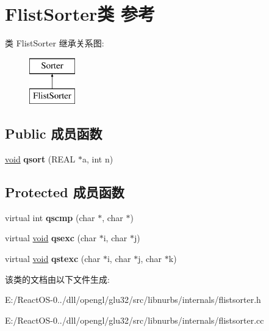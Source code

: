 \hypertarget{class_flist_sorter}{}\section{Flist\+Sorter类 参考}
\label{class_flist_sorter}
类 Flist\+Sorter 继承关系图\+:\begin{figure}[H]
\begin{center}
\leavevmode
\includegraphics[height=2.000000cm]{class_flist_sorter}
\end{center}
\end{figure}
\subsection*{Public 成员函数}
\begin{DoxyCompactItemize}
\item 
\mbox{\label{class_flist_sorter_ac0981ea723babeab25e674a819e35c62}} 
\hyperlink{interfacevoid}{void} {\bfseries qsort} (R\+E\+AL $\ast$a, int n)
\end{DoxyCompactItemize}
\subsection*{Protected 成员函数}
\begin{DoxyCompactItemize}
\item 
\mbox{\label{class_flist_sorter_ad29c95010c419265cbb762f29419ee9d}} 
virtual int {\bfseries qscmp} (char $\ast$, char $\ast$)
\item 
\mbox{\label{class_flist_sorter_a3cdef1e8dd964edab09b18f2694700c5}} 
virtual \hyperlink{interfacevoid}{void} {\bfseries qsexc} (char $\ast$i, char $\ast$j)
\item 
\mbox{\label{class_flist_sorter_af7c920f75e14fbe0ebfc87c7ac5e2b55}} 
virtual \hyperlink{interfacevoid}{void} {\bfseries qstexc} (char $\ast$i, char $\ast$j, char $\ast$k)
\end{DoxyCompactItemize}


该类的文档由以下文件生成\+:\begin{DoxyCompactItemize}
\item 
E\+:/\+React\+O\+S-\/0../dll/opengl/glu32/src/libnurbs/internals/flistsorter.\+h\item 
E\+:/\+React\+O\+S-\/0../dll/opengl/glu32/src/libnurbs/internals/flistsorter.\+cc\end{DoxyCompactItemize}
